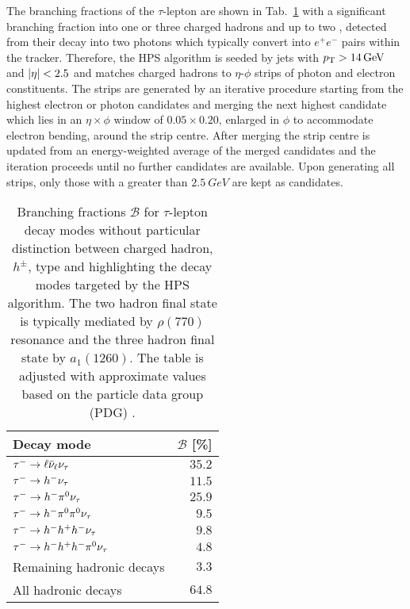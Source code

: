 The branching fractions of the $\tau$-lepton are shown in Tab.~\ref{tab:tau-decays} with a significant \Ptauh branching fraction into one or three charged hadrons and up to two \Ppizero, detected from their decay into two photons which typically convert into $e^+e^-$ pairs within the tracker. Therefore, the HPS algorithm is seeded by jets with ${p_{\text{T}}>\SI{14}{GeV}}$ and ${|\eta|<2.5}$ and matches charged hadrons to $\eta$-$\phi$ strips of photon and electron constituents. The strips are generated by an iterative procedure starting from the highest \pt electron or photon candidates and merging the next highest \pt candidate which lies in an $\eta\times\phi$ window of $0.05\times 0.20$, enlarged in $\phi$ to accommodate electron bending, around the strip centre. After merging the strip centre is updated from an energy-weighted average of the merged candidates and the iteration proceeds until no further candidates are available. Upon generating all strips, only those with a \pt greater than $\SI{2.5}{GeV}$ are kept as \Ppizero candidates.

\begin{table}[htb]
    \centering
    \begin{tabular}{lr}
        \hline\hline
        Decay mode & $\mathcal{B}$ [\%] \\
        \hline
        $\tau^-\rightarrow\ell\bar{\nu}_{\ell}\nu_{\tau}$ & $35.2$ \\
        \hline
        $\tau^-\rightarrow h^-\nu_{\tau}$ & $11.5$ \\
        $\tau^-\rightarrow h^-\pi^{0}\nu_{\tau}$ & $25.9$ \\
        $\tau^-\rightarrow h^-\pi^{0}\pi^{0}\nu_{\tau}$ & $9.5$ \\
        $\tau^-\rightarrow h^-h^+h^-\nu_{\tau}$ & $9.8$ \\
        $\tau^-\rightarrow h^-h^+h^-\pi^{0}\nu_{\tau}$ & $4.8$ \\
        Remaining hadronic decays & $3.3$ \\
        \hline
        All hadronic decays & $64.8$ \\
        \hline\hline
    \end{tabular}
    \caption[Branching fractions of the $\tau$-lepton decay modes.]{
        Branching fractions $\mathcal{B}$ for $\tau$-lepton decay modes without particular distinction between charged hadron, $h^{\pm}$, type and highlighting the decay modes targeted by the HPS algorithm. The two hadron final state is typically mediated by $\rho(770)$ resonance and the three hadron final state by $a_1(1260)$. The table is adjusted \cite{Khachatryan:2062435} with approximate values based on the particle data group (PDG) \cite{PhysRevD.98.030001}.
    }
    \label{tab:tau-decays}
\end{table}

